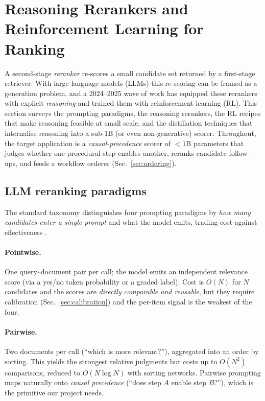 \section{Reasoning Rerankers and Reinforcement Learning for Ranking}
\label{sec:rerank-rl}

A second-stage \emph{reranker} re-scores a small candidate set returned by a
first-stage retriever. With large language models (LLMs) this re-scoring can be
framed as a generation problem, and a 2024--2025 wave of work has equipped these
rerankers with explicit \emph{reasoning} and trained them with reinforcement
learning (RL). This section surveys the prompting paradigms, the reasoning
rerankers, the RL recipes that make reasoning feasible at small scale, and the
distillation techniques that internalise reasoning into a sub-1B (or even
non-generative) scorer. Throughout, the target application is a
\emph{causal-precedence} scorer of $<\!1$B parameters that judges whether one
procedural step enables another, reranks candidate follow-ups, and feeds a
workflow orderer (Sec.~\ref{sec:ordering}).

\subsection{LLM reranking paradigms}
\label{sec:rerank-paradigms}
The standard taxonomy distinguishes four prompting paradigms by \emph{how many
candidates enter a single prompt} and what the model emits, trading cost against
effectiveness \citep{rl:zhou2025rerankingsurvey}.

\paragraph{Pointwise.} One query--document pair per call; the model emits an
independent relevance score (via a yes/no token probability or a graded label).
Cost is $O(N)$ for $N$ candidates and the scores are \emph{directly comparable
and reusable}, but they require calibration (Sec.~\ref{sec:calibration}) and the
per-item signal is the weakest of the four.

\paragraph{Pairwise.} Two documents per call (``which is more relevant?''),
aggregated into an order by sorting. This yields the strongest relative
judgments but costs up to $O(N^2)$ comparisons, reduced to $O(N\log N)$ with
sorting networks. Pairwise prompting maps naturally onto \emph{causal precedence}
(``does step $A$ enable step $B$?''), which is the primitive our project needs.

